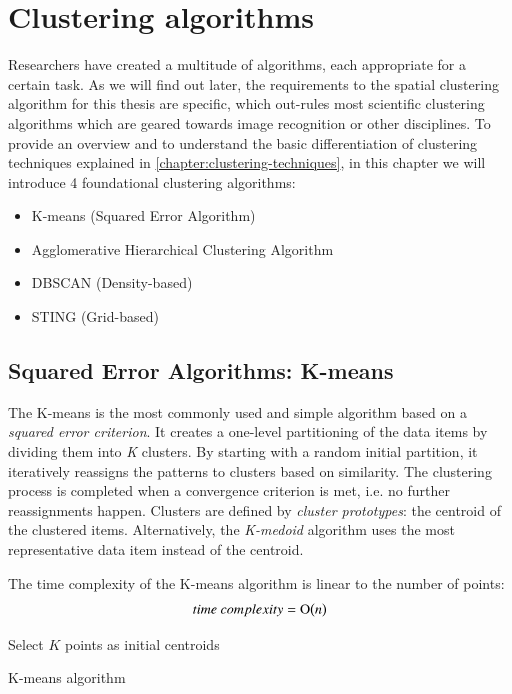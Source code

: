 
%
%

\section{Clustering algorithms}
\label{clustering-algorithms}

Researchers have created a multitude of algorithms, each appropriate for a certain task. As we will find out later, the requirements to the spatial clustering algorithm for this thesis are specific, which out-rules most scientific clustering algorithms which are geared towards image recognition or other disciplines. To provide an overview and to understand the basic differentiation of clustering techniques explained in \ref{chapter:clustering-techniques}, in this chapter we will introduce 4 foundational clustering algorithms:

\begin{itemize}
\item {K-means (Squared Error Algorithm)}
\item {Agglomerative Hierarchical Clustering Algorithm}
\item {DBSCAN (Density-based)}
\item {STING (Grid-based)}
\end{itemize}

\subsection{Squared Error Algorithms: K-means}
\label{chapter:k-means}

The K-means is the most commonly used and simple algorithm based on a \textit{squared error criterion}. It creates a one-level partitioning of the data items by dividing them into \textit{K} clusters. By starting with a random initial partition, it iteratively reassigns the patterns to clusters based on similarity.  The clustering process is completed when a convergence criterion is met, i.e. no further reassignments happen. Clusters are defined by \textit{cluster prototypes}: the centroid of the clustered items. Alternatively, the \textit{K-medoid} algorithm uses the most representative data item instead of the centroid.

The time complexity of the K-means algorithm is linear to the number of points:
\[time~complexity = \operatorname{O}\bigl(n\bigr)\]

\begin{algorithm}[h]
  \BlankLine
  {Select $K$ points as initial centroids}\;
  \caption{K-means algorithm~\cite{Meert06clustermaps}}
  \label{alg:k-means}
\end{algorithm}

